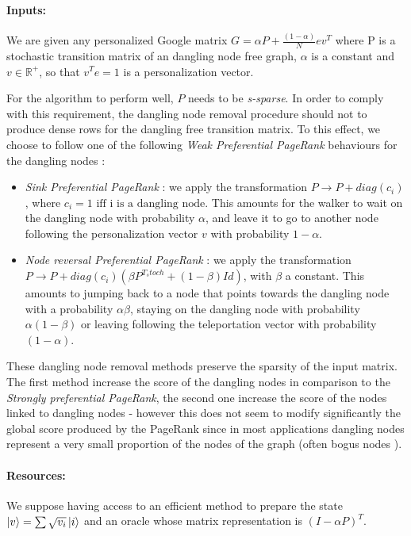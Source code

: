 \documentclass[sn-mathphys]{sn-jnl}%
\theoremstyle{thmstyleone}%
\theoremstyle{thmstyletwo}%
\theoremstyle{thmstylethree}%
\begin{document}
\paragraph{Inputs:}
We are given any personalized Google matrix
$G = \alpha P + \frac{(1-\alpha)}{N} e v^T$ where P is a stochastic
transition matrix of an dangling node free graph, $\alpha$ is a
constant and $v \in \mathbb{R}^{+}$, so that $v^T e = 1$ is a
personalization vector.

For the algorithm to perform well, $P$ needs to be
\textit{s-sparse}. In order to comply with this requirement, the
dangling node removal procedure should not to produce dense rows for
the dangling free transition matrix. To this effect, we choose to
follow one of the following \textit{Weak Preferential PageRank}
behaviours for the dangling nodes :
\begin{itemize}
\item \textit{Sink Preferential PageRank} : we apply the
  transformation $P \rightarrow P + diag(c_i)$, where
  $c_i = 1 \mbox{ iff i is a dangling node}$. This amounts for the
  walker to wait on the dangling node with probability $\alpha$, and
  leave it to go to another node following the personalization vector
  $v$ with probability $1 - \alpha$.
\item \textit{Node reversal Preferential PageRank} : we apply the
  transformation
  $P \rightarrow P + diag(c_i) (\beta P^{T_stoch} + (1-\beta)Id)$,
  with $\beta$ a constant. This amounts to jumping back to a node that
  points towards the dangling node with a probability $\alpha\beta$,
  staying on the dangling node with probability $\alpha(1-\beta)$ or
  leaving following the teleportation vector with probability
  $(1-\alpha)$.
\end{itemize}

These dangling node removal methods preserve the sparsity of the input
matrix. The first method increase the score of the dangling nodes in
comparison to the \textit{Strongly preferential PageRank}, the second
one increase the score of the nodes linked to dangling nodes - however
this does not seem to modify significantly the global score produced
by the PageRank since in most applications dangling nodes represent a
very small proportion of the nodes of the graph (often bogus nodes
\cite{brin_page_1998}).

\paragraph{Resources:}
We suppose having access to an efficient method to prepare the state
$\ket{v} = \sum \sqrt{v_i} \ket{i}$ and an oracle whose matrix
representation is $(I - \alpha P)^T$.
\end{document}
